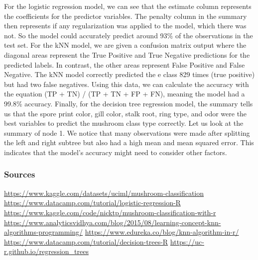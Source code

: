 \documentclass[
]{article}
\begin{document}
For the logistic regression model, we can see that the estimate column
represents the coefficients for the predictor variables. The penalty
column in the summary then represents if any regularization was applied
to the model, which there was not. So the model could accurately predict
around 93\% of the observations in the test set. For the kNN model, we
are given a confusion matrix output where the diagonal areas represent
the True Positive and True Negative predictions for the predicted
labels. In contrast, the other areas represent False Positive and False
Negative. The kNN model correctly predicted the e class 829 times (true
positive) but had two false negatives. Using this data, we can calculate
the accuracy with the equation (TP + TN) / (TP + TN + FP + FN), meaning
the model had a 99.8\% accuracy. Finally, for the decision tree
regression model, the summary tells us that the spore print color, gill
color, stalk root, ring type, and odor were the best variables to
predict the mushroom class type correctly. Let us look at the summary of
node 1. We notice that many observations were made after splitting the
left and right subtree but also had a high mean and mean squared error.
This indicates that the model's accuracy might need to consider other
factors.

\hypertarget{sources}{%
\subsubsection{Sources}\label{sources}}

\url{https://www.kaggle.com/datasets/uciml/mushroom-classification}
\url{https://www.datacamp.com/tutorial/logistic-regression-R}
\url{https://www.kaggle.com/code/nicktp/mushroom-classification-with-r}
\url{https://www.analyticsvidhya.com/blog/2015/08/learning-concept-knn-algorithms-programming/}
\url{https://www.edureka.co/blog/knn-algorithm-in-r/}
\url{https://www.datacamp.com/tutorial/decision-trees-R}
\url{https://uc-r.github.io/regression_trees}
\end{document}

